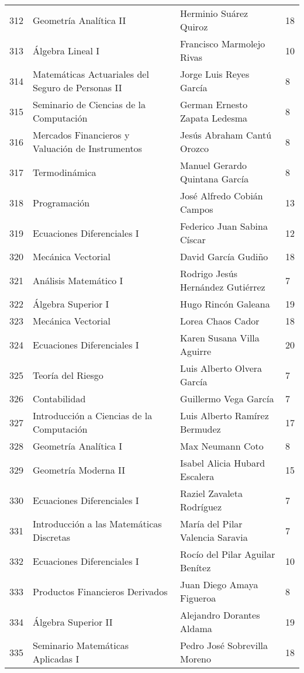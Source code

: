 \begin{table}[ht]
\begin{tabular}{rlll}
  312 & Geometría Analítica II & Herminio Suárez Quiroz & 18 \\ 
  313 & Álgebra Lineal I & Francisco Marmolejo Rivas & 10 \\ 
  314 & Matemáticas Actuariales del Seguro de Personas II & Jorge Luis Reyes García & 8 \\ 
  315 & Seminario de Ciencias de la Computación & German Ernesto Zapata Ledesma & 8 \\ 
  316 & Mercados Financieros y Valuación de Instrumentos & Jesús Abraham Cantú Orozco & 8 \\ 
  317 & Termodinámica & Manuel Gerardo Quintana García & 8 \\ 
  318 & Programación & José Alfredo Cobián Campos & 13 \\ 
  319 & Ecuaciones Diferenciales I & Federico Juan Sabina Císcar & 12 \\ 
  320 & Mecánica Vectorial & David García Gudiño & 18 \\ 
  321 & Análisis Matemático I & Rodrigo Jesús Hernández Gutiérrez & 7 \\ 
  322 & Álgebra Superior I & Hugo Rincón Galeana & 19 \\ 
  323 & Mecánica Vectorial & Lorea Chaos Cador & 18 \\ 
  324 & Ecuaciones Diferenciales I & Karen Susana Villa Aguirre & 20 \\ 
  325 & Teoría del Riesgo & Luis Alberto Olvera García & 7 \\ 
  326 & Contabilidad & Guillermo Vega García & 7 \\ 
  327 & Introducción a Ciencias de la Computación & Luis Alberto Ramírez Bermudez & 17 \\ 
  328 & Geometría Analítica I & Max Neumann Coto & 8 \\ 
  329 & Geometría Moderna II & Isabel Alicia Hubard Escalera & 15 \\ 
  330 & Ecuaciones Diferenciales I & Raziel Zavaleta Rodríguez & 7 \\ 
  331 & Introducción a las Matemáticas Discretas & María del Pilar Valencia Saravia & 7 \\ 
  332 & Ecuaciones Diferenciales I & Rocío del Pilar Aguilar Benítez & 10 \\ 
  333 & Productos Financieros Derivados & Juan Diego Amaya Figueroa & 8 \\ 
  334 & Álgebra Superior II & Alejandro Dorantes Aldama & 19 \\ 
  335 & Seminario Matemáticas Aplicadas I & Pedro José Sobrevilla Moreno & 18 \\ 

\end{tabular}
\end{table}
